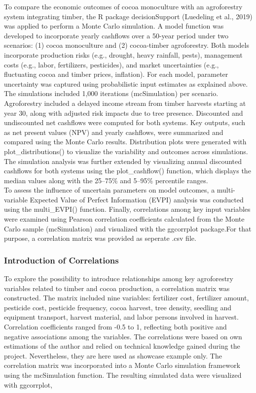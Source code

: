 \documentclass[
]{article}
\begin{document}
To compare the economic outcomes of cocoa monoculture with an
agroforestry system integrating timber, the R package decisionSupport
(Luedeling et al., 2019) was applied to perform a Monte Carlo
simulation. A model function was developed to incorporate yearly
cashflows over a 50-year period under two scenarios: (1) cocoa
monoculture and (2) cocoa-timber agroforestry. Both models incorporate
production risks (e.g., drought, heavy rainfall, pests), management
costs (e.g., labor, fertilizers, pesticides), and market uncertainties
(e.g., fluctuating cocoa and timber prices, inflation). For each model,
parameter uncertainty was captured using probabilistic input estimates
as explained above. The simulations included 1,000 iterations
(mcSimulation) per scenario. Agroforestry included a delayed income
stream from timber harvests starting at year 30, along with adjusted
risk impacts due to tree presence. Discounted and undiscounted net
cashflows were computed for both systems. Key outputs, such as net
present values (NPV) and yearly cashflows, were summarized and compared
using the Monte Carlo results. Distribution plots were generated with
plot\_distributions() to visualize the variability and outcomes across
simulations.\\
The simulation analysis was further extended by visualizing annual
discounted cashflows for both systems using the plot\_cashflow()
function, which displays the median values along with the 25--75\% and
5--95\% percentile ranges.\\
To assess the influence of uncertain parameters on model outcomes, a
multi-variable Expected Value of Perfect Information (EVPI) analysis was
conducted using the multi\_EVPI() function. Finally, correlations among
key input variables were examined using Pearson correlation coefficients
calculated from the Monte Carlo sample (mcSimulation) and visualized
with the ggcorrplot package.For that purpose, a correlation matrix was
provided as seperate .csv file.

\hypertarget{introduction-of-correlations}{%
\subsubsection{Introduction of
Correlations}\label{introduction-of-correlations}}

To explore the possibility to introduce relationships among key
agroforestry variables related to timber and cocoa production, a
correlation matrix was constructed. The matrix included nine variables:
fertilizer cost, fertilizer amount, pesticide cost, pesticide frequency,
cocoa harvest, tree density, seedling and equipment transport, harvest
material, and labor persons involved in harvest. Correlation
coefficients ranged from -0.5 to 1, reflecting both positive and
negative associations among the variables. The correlations were based
on own estimations of the author and relied on technical knowledge
gained during the project. Nevertheless, they are here used as showcase
example only. The correlation matrix was incorporated into a Monte Carlo
simulation framework using the mcSimulation function. The resulting
simulated data were visualized with ggcorrplot,
\end{document}
